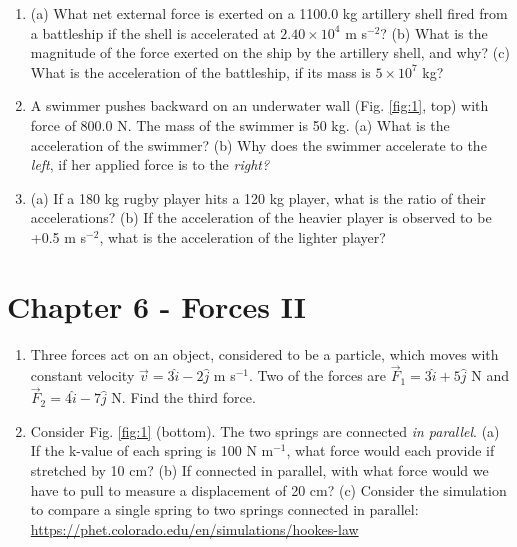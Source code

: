 \documentclass{article}
\begin{document}
\begin{enumerate}
\item (a) What net external force is exerted on a 1100.0 kg artillery shell fired from a battleship if the shell is accelerated at $2.40\times 10^4$ m s$^{-2}$? (b) What is the magnitude of the force exerted on the ship by the artillery shell, and why? (c) What is the acceleration of the battleship, if its mass is $5\times 10^7$ kg? \\ \vspace{3cm}
\item A swimmer pushes backward on an underwater wall (Fig. \ref{fig:1}, top) with force of 800.0 N. The mass of the swimmer is 50 kg.  (a) What is the acceleration of the swimmer? (b) Why does the swimmer accelerate to the \textit{left}, if her applied force is to the \textit{right?} \\ \vspace{2cm}
\item (a) If a 180 kg rugby player hits a 120 kg player, what is the ratio of their accelerations? (b) If the acceleration of the heavier player is observed to be +0.5 m s$^{-2}$, what is the acceleration of the lighter player? \\ \vspace{1cm}
\end{enumerate}

\section{Chapter 6 - Forces II}

\begin{enumerate}
\item Three forces act on an object, considered to be a particle, which moves with constant velocity $\vec{v} = 3\hat{i} - 2\hat{j}$ m s$^{-1}$.  Two of the forces are $\vec{F}_1 = 3\hat{i} + 5\hat{j}$ N and $\vec{F}_2 = 4\hat{i} - 7\hat{j}$ N.  Find the third force. \\ \vspace{3cm}
\item Consider Fig. \ref{fig:1} (bottom).  The two springs are connected \textit{in parallel}.  (a) If the k-value of each spring is 100 N m$^{-1}$, what force would each provide if stretched by 10 cm?  (b) If connected in parallel, with what force would we have to pull to measure a displacement of 20 cm? (c) Consider the simulation to compare a single spring to two springs connected in parallel: \small \url{https://phet.colorado.edu/en/simulations/hookes-law} \normalsize
\end{enumerate}
\end{document}
